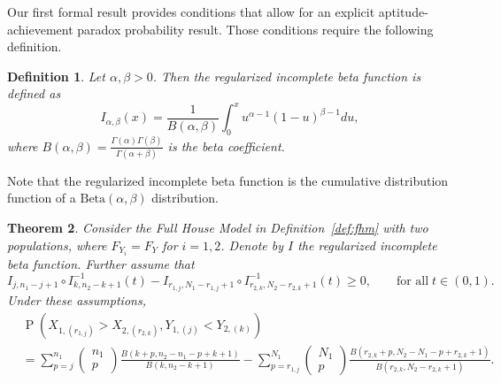 \documentclass[12pt]{article}
\DeclareMathOperator*{\Prob}{P}
\newtheorem{theorem}{Theorem}[section]
\newtheorem{defn}[theorem]{Definition}
\begin{document}
Our first formal result provides conditions that allow for an explicit aptitude-achievement paradox probability result. Those conditions require the following definition.

\begin{defn}
\label{def:ribf}
Let $\alpha,\beta > 0$. Then the regularized incomplete beta function is defined as
$$
  I_{\alpha,\beta}(x) = \frac{1}{B(\alpha,\beta)} \int_0^x u^{\alpha-1}(1-u)^{\beta-1}du,
$$
where $B(\alpha,\beta) = \frac{\Gamma(\alpha)\Gamma(\beta)}{\Gamma(\alpha + \beta)}$ is the beta coefficient.
\end{defn}

Note that the regularized incomplete beta function is the cumulative distribution function of a $\text{Beta}(\alpha,\beta)$ distribution. 

\begin{theorem} \label{theorem:samedistgeneral}
Consider the Full House Model in Definition~\ref{def:fhm} with two populations, where $F_{Y_i} = F_{Y}$ for $i=1,2$. Denote by $I$ the regularized incomplete beta function. Further assume that
\begin{equation} \label{eq:technical-condition}
  I_{j, n_1-j+1} \circ I_{k, n_2-k+1}^{-1} (t) - I_{r_{1,j}, N_1 - r_{1,j}+1} \circ I_{r_{2,k}, N_2 - r_{2,k} + 1}^{-1}(t) \geq 0, \qquad \text{for all} \; t \in (0,1).
\end{equation}
Under these assumptions,
\begin{align*}
	&\Prob\left(X_{1,(r_{1,j})} > X_{2,(r_{2,k})}, Y_{1,(j)} < Y_{2,(k)}\right) \\
  &= \sum_{p=j}^{n_1}\left(\begin{array}{l}
n_1 \\
p
\end{array}\right)\frac{B(k+p, n_2-n_1-p+k+1)}{B(k, n_2-k+1)} - \sum_{p=r_{1,j}}^{N_1}\left(\begin{array}{l}
N_1 \\
p
\end{array}\right)\frac{B(r_{2,k}+p, N_2-N_1-p+r_{2,k}+1)}{B(r_{2,k}, N_2-r_{2,k}+1)}.
\end{align*}
\end{theorem}


\end{document}
